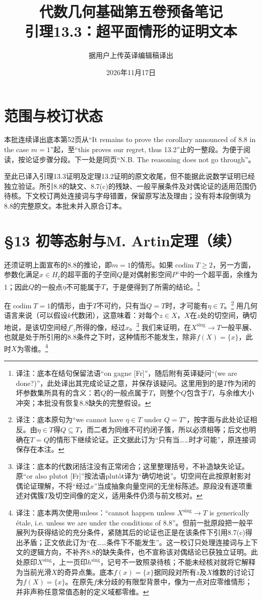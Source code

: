 \documentclass[openany,fontset=fandol]{ctexbook}
\newcommand{\note}[1]{\footnote{译注：#1}}
\begin{document}
\title{代数几何基础第五卷预备笔记\\引理13.3：超平面情形的证明文本}
\author{据用户上传英译编辑稿译出}
\date{2026年11月17日}
\maketitle
\chapter*{范围与校订状态}
本批连续译出底本第52页从“It remains to prove the corollary announced of 8.8 in the case $m=1$”起，至“this proves our regret, thus 13.2”止的一整段。为便于阅读，按论证步骤分段。下一处是同页“N.B. The reasoning does not go through”。

至此已译入引理13.3证明及定理13.2证明的原文收尾，但不能据此说数学证明已经独立验证。所引8.8的缺文、8.7(c)的残缺、一般平展条件及对偶论证的适用范围仍待核。下文校订两处连接词与字母错置，保留原写法及理由；没有将本段倒填为8.8的完整原文。本批未并入原合订本。
\chapter*{§13 初等态射与M. Artin定理（续）}
还须证明上面宣布的8.8的推论，即$m=1$的情形。如果$\operatorname{codim}T\geq2$，另一方面，参数化满足$x\in H_\xi$的超平面的子空间$Q$是对偶射影空间$P^\vee$中的一个超平面，余维为1；因此$Q$的一般点$\eta$不可能属于$T$，于是便得到了所需的结论。\note{底本在结句保留法语“on gagne [Fr]”，随后附有英译疑问“(we are done?)”，此处译出其完成论证之意，并保存该疑问。这里用到的是$T$作为闭的坏参数集所具有的含义：若$Q$的一般点属于$T$，则整个$Q$包含于$T$，与余维大小冲突；本批没有恢复8.8缺失的完整假设。}

在$\operatorname{codim}T=1$的情形，由于$T$不可约，只有当$Q=T$时，才可能有$\eta\in T$。\note{底本原句为“we cannot have $\eta\in T$ under $Q=T$”，按字面与此处论证相反。由$\eta\in T$得$Q\subseteq T$，而二者为同维不可约闭子簇，所以必须相等；后文也明确在$T=Q$的情形下继续论证。正文据此订为“只有当……时才可能”，原连接词保存在本注。}
用几何语言来说（可以假设$k$代数闭），这意味着：对每个$z\in X$，$X$在$z$处的切空间，确切地说，是该切空间经$f'_z$所得的像，经过$x$。\note{底本的代数闭括注没有正常闭合；这里整理括号，不补造缺失论证。原“or also plutot [Fr]”按法语plutôt译为“确切地说”。切空间在此按原射影对偶论证理解，不将“经过$x$”当成抽象向量空间的无坐标陈述。原段没有逐项重述对偶簇$T$及切空间像的定义，适用条件仍须与前文核对。}
\newpage
我们来证明，在$X^{\mathrm{sing}}\to T$一般平展、也就是处于所引用的8.8条件之下时，这种情形不能发生，除非$f(X)=\{x\}$，此时$X$为零维。\note{底本两次使用unless：“cannot happen unless $X^{\mathrm{sing}}\to T$ is generically étale, i.e. unless we are under the conditions of 8.8”。但前一批原段把一般平展列为获得结论的充分条件，紧随其后的论证也正是在该条件下引用8.7(c)得出矛盾；正文依此订为“在……条件下不能发生”。这一校订只处理连接词与上下文的逻辑方向，不补齐8.8的缺失条件，也不宣称该对偶结论已获独立证明。此处原印$X^{\mathrm{sing}}$，上一页印$h^{\mathrm{sing}}$，记号不一致照录待核；不能未经核对就将它解释为当前光滑$X$的奇异点集。底本$f(x)=\{x\}$据同段对所有$z$及$X$维数的讨论订为$f(X)=\{x\}$。在原先$f$未分歧的有限型背景中，像为一点对应零维情形；并非声称任意常值态射的定义域都零维。}
\end{document}
